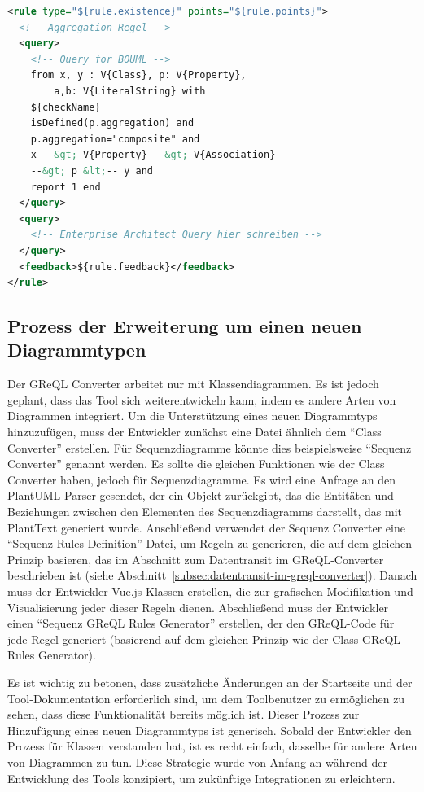 \begin{lstlisting}[caption={ Codebeispiel mit mehreren Queries}, label={lst:example_more_Queries}, float=!ht, language=xml]
<rule type="${rule.existence}" points="${rule.points}">
  <!-- Aggregation Regel -->
  <query>
    <!-- Query for BOUML -->
	from x, y : V{Class}, p: V{Property},
        a,b: V{LiteralString} with
	${checkName}
	isDefined(p.aggregation) and
	p.aggregation="composite" and
	x --&gt; V{Property} --&gt; V{Association}
	--&gt; p &lt;-- y and
	report 1 end
  </query>
  <query>
    <!-- Enterprise Architect Query hier schreiben -->
  </query>
  <feedback>${rule.feedback}</feedback>
</rule>
\end{lstlisting}

\subsection{Prozess der Erweiterung um einen neuen Diagrammtypen}


Der GReQL Converter arbeitet nur mit Klassendiagrammen. Es ist jedoch geplant, dass das Tool sich weiterentwickeln kann,
indem es andere Arten von Diagrammen integriert. Um die Unterstützung eines neuen Diagrammtyps hinzuzufügen, muss der
Entwickler zunächst eine Datei ähnlich dem ``Class Converter'' erstellen. Für Sequenzdiagramme könnte dies beispielsweise
``Sequenz Converter'' genannt werden. Es sollte die gleichen Funktionen wie der Class Converter haben, jedoch für
Sequenzdiagramme. Es wird eine Anfrage an den PlantUML-Parser gesendet, der ein Objekt zurückgibt, das die Entitäten
und Beziehungen zwischen den Elementen des Sequenzdiagramms darstellt, das mit PlantText generiert wurde. Anschließend
verwendet der Sequenz Converter eine ``Sequenz Rules Definition''-Datei, um Regeln zu generieren, die auf dem gleichen
Prinzip basieren, das im Abschnitt zum Datentransit im GReQL-Converter beschrieben ist
(siehe Abschnitt~\ref{subsec:datentransit-im-greql-converter}). Danach muss der Entwickler Vue.js-Klassen erstellen, die
zur grafischen Modifikation und Visualisierung jeder dieser Regeln dienen. Abschließend muss der Entwickler einen
``Sequenz GReQL Rules Generator'' erstellen, der den GReQL-Code für jede Regel generiert (basierend auf dem gleichen
Prinzip wie der Class GReQL Rules Generator).

Es ist wichtig zu betonen, dass zusätzliche Änderungen an der Startseite und der Tool-Dokumentation erforderlich sind,
um dem Toolbenutzer zu ermöglichen zu sehen, dass diese Funktionalität bereits möglich ist. Dieser Prozess zur
Hinzufügung eines neuen Diagrammtyps ist generisch. Sobald der Entwickler den Prozess für Klassen verstanden hat, ist es
recht einfach, dasselbe für andere Arten von Diagrammen zu tun. Diese Strategie wurde von Anfang an während der
Entwicklung des Tools konzipiert, um zukünftige Integrationen zu erleichtern.


